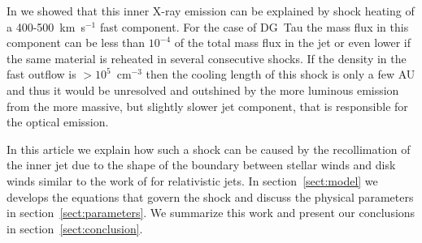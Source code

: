 In \citet{2009A&A...493..579G} we showed that this inner X-ray emission can be explained by shock heating of a 400-500~km~s$^{-1}$ fast component. For the case of DG~Tau the mass flux in this component can be less than $10^{-4}$ of the total mass flux in the jet or even lower if the same material is reheated in several consecutive shocks. If the density in the fast outflow is $>10^5$~cm$^{-3}$ then the cooling length of this shock is only a few AU and thus it would be unresolved and outshined by the more luminous emission from the more massive, but slightly slower jet component, that is responsible for the optical emission.

In this article we explain how such a shock can be caused by the recollimation of the inner jet due to the shape of the boundary between stellar winds and disk winds similar to the work of \citet{2012MNRAS.422.2282K} for relativistic jets. In section~\ref{sect:model} we develops the equations that govern the shock and discuss the physical parameters in section~\ref{sect:parameters}. We summarize this work and present our conclusions in section~\ref{sect:conclusion}.